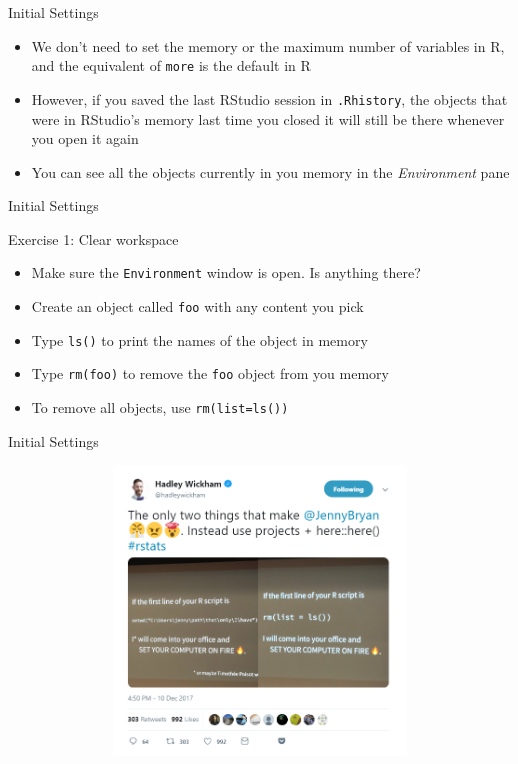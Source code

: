 \documentclass[ignorenonframetext,]{beamer}
\providecommand{\tightlist}{%
  \setlength{\itemsep}{0pt}\setlength{\parskip}{0pt}}
\begin{document}
\begin{frame}[fragile]{Initial Settings}

\begin{itemize}
\tightlist
\item
  We don't need to set the memory or the maximum number of variables in
  R, and the equivalent of \texttt{more} is the default in R
\item
  However, if you saved the last RStudio session in \texttt{.Rhistory},
  the objects that were in RStudio's memory last time you closed it will
  still be there whenever you open it again
\item
  You can see all the objects currently in you memory in the
  \emph{Environment} pane
\end{itemize}

\end{frame}

\begin{frame}[fragile]{Initial Settings}

\begin{block}{Exercise 1: Clear workspace}

\begin{itemize}
\tightlist
\item
  Make sure the \texttt{Environment} window is open. Is anything there?
\item
  Create an object called \texttt{foo} with any content you pick
\item
  Type \texttt{ls()} to print the names of the object in memory
\item
  Type \texttt{rm(foo)} to remove the \texttt{foo} object from you
  memory
\item
  To remove all objects, use \texttt{rm(list=ls())}
\end{itemize}

\end{block}

\end{frame}

\begin{frame}{Initial Settings}

\begin{figure}
\centering
  \includegraphics[width=12cm,height=7.7cm]{img/rm.png}
\end{figure}

\end{frame}
\end{document}

